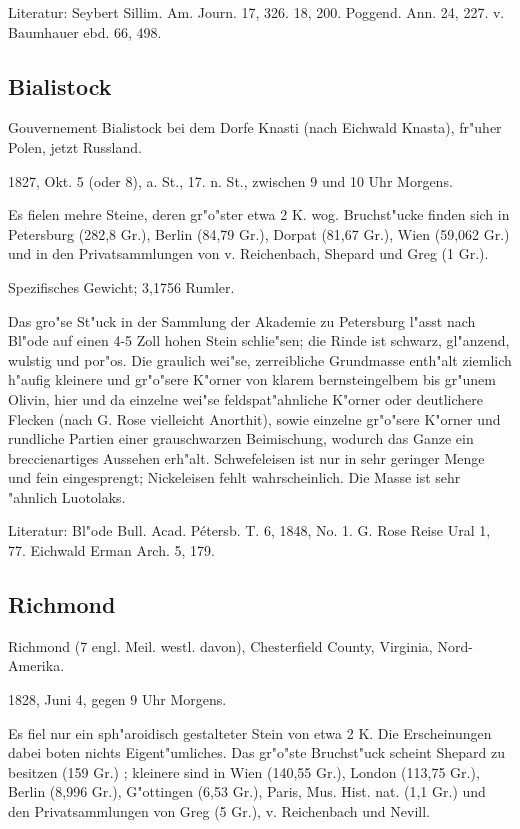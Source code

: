 \documentclass[a4paper, 11pt, oneside]{article}
\begin{document}
Literatur: Seybert Sillim. Am. Journ. 17, 326. 18, 200. Poggend. Ann. 24, 227. v. Baumhauer ebd. 66, 498.

\subsection{Bialistock}

Gouvernement Bialistock bei dem Dorfe Knasti (nach Eichwald Knasta), fr"uher Polen, jetzt Russland.

1827, Okt. 5 (oder 8), a. St., 17. n. St., zwischen 9 und 10 Uhr Morgens.

Es fielen mehre Steine, deren gr"o"ster etwa 2 K. wog. Bruchst"ucke finden sich in Petersburg (282,8 Gr.), Berlin (84,79 Gr.), Dorpat (81,67 Gr.), Wien (59,062 Gr.) und in den Privatsammlungen von v. Reichenbach, Shepard und Greg (1 Gr.).

Spezifisches Gewicht; 3,1756 Rumler.

Das gro"se St"uck in der Sammlung der Akademie zu Petersburg l"asst nach Bl"ode auf einen 4-5 Zoll hohen Stein schlie"sen; die Rinde ist schwarz, gl"anzend, wulstig und por"os. Die graulich wei"se, zerreibliche Grundmasse enth"alt ziemlich h"aufig kleinere und gr"o"sere K"orner von klarem bernsteingelbem bis gr"unem Olivin, hier und da einzelne wei"se feldspat"ahnliche K"orner oder deutlichere Flecken (nach G. Rose vielleicht Anorthit), sowie einzelne gr"o"sere K"orner und rundliche Partien einer grauschwarzen Beimischung, wodurch das Ganze ein breccienartiges Aussehen erh"alt. Schwefeleisen ist nur in sehr geringer Menge und fein eingesprengt; Nickeleisen fehlt wahrscheinlich. Die Masse ist sehr "ahnlich Luotolaks.

Literatur: Bl"ode Bull. Acad. Pétersb. T. 6, 1848, No. 1. G. Rose Reise Ural 1, 77. Eichwald Erman Arch. 5, 179.

\subsection{Richmond}

Richmond (7 engl. Meil. westl. davon), Chesterfield County, Virginia, Nord-Amerika.

1828, Juni 4, gegen 9 Uhr Morgens.

Es fiel nur ein sph"aroidisch gestalteter Stein von etwa 2 K. Die Erscheinungen dabei boten nichts Eigent"umliches. Das gr"o"ste Bruchst"uck scheint Shepard zu besitzen (159 Gr.) ; kleinere sind in Wien (140,55 Gr.), London (113,75 Gr.), Berlin (8,996 Gr.), G"ottingen (6,53 Gr.), Paris, Mus. Hist. nat. (1,1 Gr.) und den Privatsammlungen von Greg (5 Gr.), v. Reichenbach und Nevill.
\end{document}
